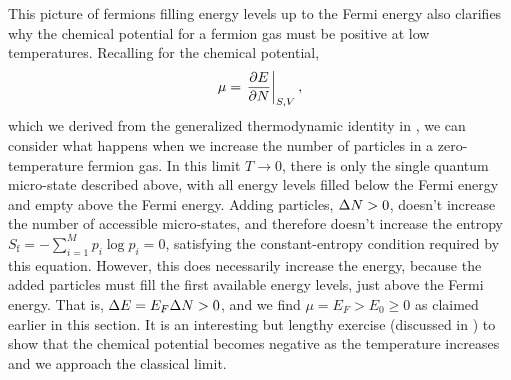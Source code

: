 This picture of fermions filling energy levels up to the Fermi energy also clarifies why the chemical potential for a fermion gas must be positive at low temperatures.
Recalling  for the chemical potential,
\begin{equation*}
  \mu = \left.\frac{\partial E}{\partial N}\right|_{S, V},
\end{equation*}
which we derived from the generalized thermodynamic identity in , we can consider what happens when we increase the number of particles in a zero-temperature fermion gas.
In this limit $T \to 0$, there is only the single quantum micro-state described above, with all energy levels filled below the Fermi energy and empty above the Fermi energy.
Adding particles, $\Delta N > 0$, doesn't increase the number of accessible micro-states, and therefore doesn't increase the entropy $S_{\text{f}} = -\sum_{i = 1}^M p_i \log p_i = 0$, satisfying the constant-entropy condition required by this equation.
However, this does necessarily increase the energy, because the added particles must fill the first available energy levels, just above the Fermi energy. %
That is, $\Delta E = E_F \Delta N > 0$, and we find $\mu = E_F > E_0 \geq 0$ as claimed earlier in this section.
It is an interesting but lengthy exercise (discussed in ) to show that the chemical potential becomes negative as the temperature increases and we approach the classical limit.

